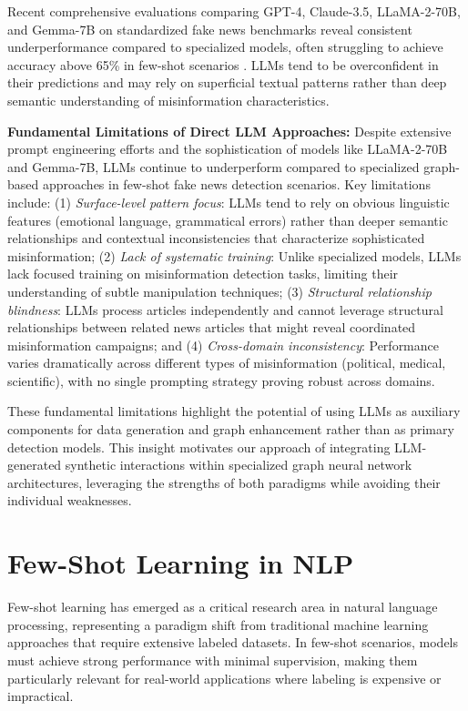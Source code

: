 Recent comprehensive evaluations comparing GPT-4, Claude-3.5, LLaMA-2-70B, and Gemma-7B on standardized fake news benchmarks reveal consistent underperformance compared to specialized models, often struggling to achieve accuracy above 65\% in few-shot scenarios \cite{huang2023chatgpt, zhang2023can}. LLMs tend to be overconfident in their predictions and may rely on superficial textual patterns rather than deep semantic understanding of misinformation characteristics.


\textbf{Fundamental Limitations of Direct LLM Approaches:} Despite extensive prompt engineering efforts and the sophistication of models like LLaMA-2-70B and Gemma-7B, LLMs continue to underperform compared to specialized graph-based approaches in few-shot fake news detection scenarios. Key limitations include: (1) \emph{Surface-level pattern focus}: LLMs tend to rely on obvious linguistic features (emotional language, grammatical errors) rather than deeper semantic relationships and contextual inconsistencies that characterize sophisticated misinformation; (2) \emph{Lack of systematic training}: Unlike specialized models, LLMs lack focused training on misinformation detection tasks, limiting their understanding of subtle manipulation techniques; (3) \emph{Structural relationship blindness}: LLMs process articles independently and cannot leverage structural relationships between related news articles that might reveal coordinated misinformation campaigns; and (4) \emph{Cross-domain inconsistency}: Performance varies dramatically across different types of misinformation (political, medical, scientific), with no single prompting strategy proving robust across domains.

These fundamental limitations highlight the potential of using LLMs as auxiliary components for data generation and graph enhancement rather than as primary detection models. This insight motivates our approach of integrating LLM-generated synthetic interactions within specialized graph neural network architectures, leveraging the strengths of both paradigms while avoiding their individual weaknesses.

\section{Few-Shot Learning in NLP}

Few-shot learning has emerged as a critical research area in natural language processing, representing a paradigm shift from traditional machine learning approaches that require extensive labeled datasets. In few-shot scenarios, models must achieve strong performance with minimal supervision, making them particularly relevant for real-world applications where labeling is expensive or impractical.


